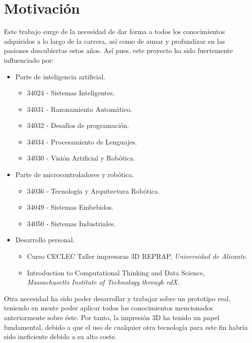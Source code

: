 %
%
%
%

\section{Motivación}
\label{sec:motivación}

Este trabajo surge de la necesidad de dar forma a todos los conocimientos adquiridos
a lo largo de la carrera, así como de aunar y profundizar
en las pasiones descubiertas estos años. Así pues, este proyecto ha sido fuertemente influenciado por:

\begin{itemize}
  \item Parte de inteligencia artificial.
    \begin{itemize}
      \item 34024 - Sistemas Inteligentes.
      \item 34031 - Razonamiento Automático.
      \item 34032 - Desafíos de programación.
      \item 34034 - Procesamiento de Lenguajes.
      \item 34030 - Visión Artificial y Robótica.
    \end{itemize}


  \item Parte de microcontroladores y robótica.
    \begin{itemize}
      \item 34036 - Tecnología y Arquitectura Robótica.
      \item 34049 - Sistemas Embebidos.
      \item 34050 - Sistemas Industriales.
    \end{itemize}

  \item Desarrollo personal.
    \begin{itemize}
      \item Curso CECLEC Taller impresoras 3D REPRAP, \textit{Universidad de
        Alicante}.
      \item Introduction to Computational Thinking and Data Science,
        \textit{Massachusetts Institute of Technology through edX}.
    \end{itemize}
\end{itemize}


Otra necesidad ha sido poder desarrollar y trabajar sobre un prototipo real,
teniendo en mente poder aplicar todos los conocimientos mencionados
anteriormente
sobre éste. Por tanto, la impresión 3D ha tenido un papel fundamental, debido a que el uso
de cualquier otra tecnología para este fin habría sido ineficiente debido a su
alto coste.



